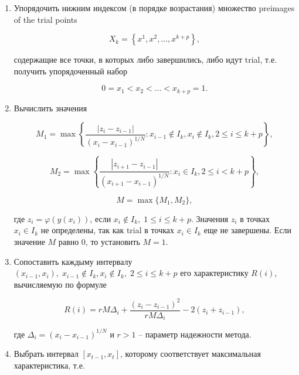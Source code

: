 \documentclass{svproc}
\begin{document}
\begin{enumerate}
\item  Упорядочить нижним индексом (в порядке возрастания) множество preimages of the trial points

\begin{displaymath}
X_k=\left\{x^1,x^2,\ldots,x^{k+p}\right\},
\end{displaymath}

содержащие все точки, в которых либо завершились, либо идут trial, т.е. получить упорядоченный набор

\begin{displaymath}
0=x_1<x_2<\ldots<x_{k+p}=1.
\end{displaymath}

\item  Вычислить значения

\begin{displaymath}
M_1=\max{\left\{\frac{\left|z_i-z_{i-1}\right|}{\left(x_i-x_{i-1}\right)^{1/N}}:x_{i-1}\notin I_k,x_i\notin I_k,2\le i\le k+p\right\}},
\end{displaymath}

\begin{displaymath}
M_2=\max{\left\{\frac{\left|z_{i+1}-z_{i-1}\right|}{\left(x_{i+1}-x_{i-1}\right)^{1/N}}:x_i\in I_k,2\le i<k+p\right\}},
\end{displaymath}

\begin{displaymath}
M=\max{\{}M_1,M_2\},
\end{displaymath}

где $ z_i=\varphi\left(y\left(x_i\right)\right)$, если $x_i\notin I_k,\;1\le i\le k+p$. Значения $z_i$ в точках $x_i\in I_k$ не определены, так как trial в точках $x_i\in I_k$ еще не завершены. Если значение $M$ равно $0$, то установить $M=1$.

\item  Сопоставить каждыму интервалу $\left(x_{i-1},x_i\right),\;x_{i-1}\notin I_k,x_i\notin I_k,\;2\le i\le k+p$ его характеристику $R\left(i\right)$, вычисляемую по формуле

\begin{displaymath}
R\left(i\right)=rM\Delta_i+\frac{\left(z_i-z_{i-1}\right)^2}{rM\Delta_i}-2\left(z_i+z_{i-1}\right),
\end{displaymath}

где $\Delta_i=\left(x_i-x_{i-1}\right)^{1/N}$ и $ r>1$ -- параметр надежности метода.

\item  Выбрать интервал $\left[x_{t-1},x_t\right]$, которому соответствует максимальная характеристика, т.е.


\end{enumerate}
\end{document}
